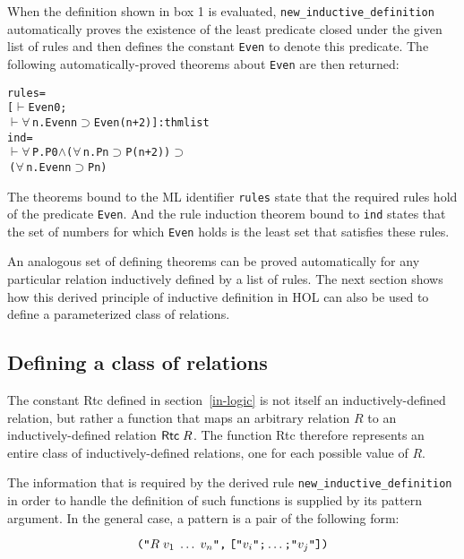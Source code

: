 When the definition shown in box 1 is evaluated,
\verb!new_inductive_definition! automatically proves the existence of the least
predicate closed under the given list of rules and then defines the constant
\verb!Even! to denote this predicate.  The following automatically-proved
theorems about \verb!Even! are then returned:

\begin{session}\begin{alltt}
rules = 
[\(\vdash\) Even 0; 
 \(\vdash\) \(\forall\,\)n. Even n \(\supset\) Even(n + 2)] : thm list
ind = 
\(\vdash\) \(\forall\,\)P. P 0 \(\wedge\) (\(\forall\,\)n. P n \(\supset\) P(n + 2)) \(\supset\) 
      \(\,\)(\(\forall\,\)n. Even n \(\supset\) P n)
\end{alltt}\end{session}


\noindent The theorems bound to the {\small ML} identifier \verb!rules! state
that the required rules hold of the predicate \verb!Even!. And the rule
induction theorem bound to \verb!ind! states that the set of numbers for which
\verb!Even! holds is the least set that satisfies these rules.

An analogous set of defining theorems can be proved automatically for any
particular relation inductively defined by a list of rules.  The next section
shows how this derived principle of inductive definition in {\small HOL} can
also be used to define a parameterized class of relations.

\subsection{Defining a class of relations}

The constant {\sf Rtc} defined in section~\ref{in-logic} is not itself an
inductively-defined relation, but rather a function that maps an arbitrary
relation $R$ to an inductively-defined relation ${\sf Rtc}\;R$.  The function
{\sf Rtc} therefore represents an entire class of inductively-defined
relations, one for each possible value of $R$.  

The information that is required by the derived rule
\verb!new_inductive_definition! in order to handle the definition of such
functions is supplied by its pattern argument.  In the general case, a pattern
is a pair of the following form:

\[\hbox{\verb!("!}R\;v_1\;\dots\;v_n\hbox{\verb!",!}\;
 \hbox{\verb!["!}v_i\hbox{\verb!";!}\dots\hbox{\verb!;"!}v_j\hbox{\verb!"])!}
\]

